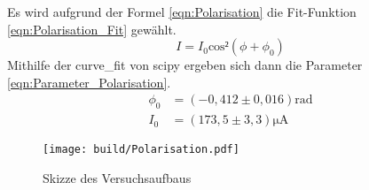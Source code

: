 Es wird aufgrund der Formel \eqref{eqn:Polarisation} die Fit-Funktion \eqref{eqn:Polarisation_Fit} gewählt.
\begin{equation}
  I=I_0\text{cos}²(\phi + \phi_0)
  \label{eqn:Polarisation_Fit}
\end{equation}
Mithilfe der curve\_fit von scipy \cite{scipy} ergeben sich dann die Parameter \eqref{eqn:Parameter_Polarisation}.
\begin{align}
  \phi_0&=(-0,412\pm 0,016)\si{\radian}\nonumber\\
  I_0&=(173,5\pm 3,3)\si{\micro\ampere}\label{eqn:Parameter_Polarisation}
\end{align}
\begin{figure}
  \centering
  \texttt{[image: build/Polarisation.pdf]}
  \caption{Skizze des Versuchsaufbaus}
  \label{fig:Polarisation}
\end{figure}


